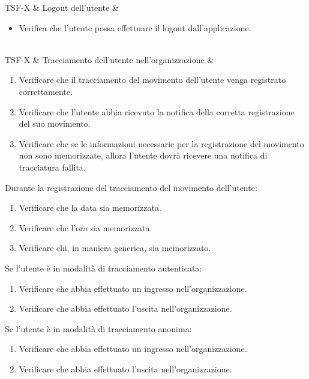 TSF-X & Logout dell'utente & \begin{itemize}
    \item Verifica che l'utente possa effettuare il logout dall'applicazione.
\end{itemize} \\

TSF-X & Tracciamento dell'utente nell'organizzazione & \begin{enumerate}
    \item Verificare che il tracciamento del movimento dell'utente venga registrato correttamente.
    \item Verificare che l'utente abbia ricevuto la notifica della corretta registrazione del suo movimento.
    \item Verificare che se le informazioni necessarie per la registrazione del movimento non sono memorizzate, allora l'utente dovrà ricevere una notifica di tracciatura fallita.
\end{enumerate}
Durante la registrazione del tracciamento del movimento dell'utente:
\begin{enumerate}
    \item Verificare che la data sia memorizzata.
    \item Verificare che l'ora sia memorizzata.
    \item Verificare chi, in maniera generica, sia memorizzato.
\end{enumerate}
Se l'utente è in modalità di tracciamento autenticata:
\begin{enumerate}
    \item Verificare che abbia effettuato un ingresso nell'organizzazione.
    \item Verificare che abbia effettuato l'uscita nell'organizzazione.
\end{enumerate}
Se l'utente è in modalità di tracciamento anonima:
\begin{enumerate}
    \item Verificare che abbia effettuato un ingresso nell'organizzazione.
    \item Verificare che abbia effettuato l'uscita nell'organizzazione.
\end{enumerate} \\

